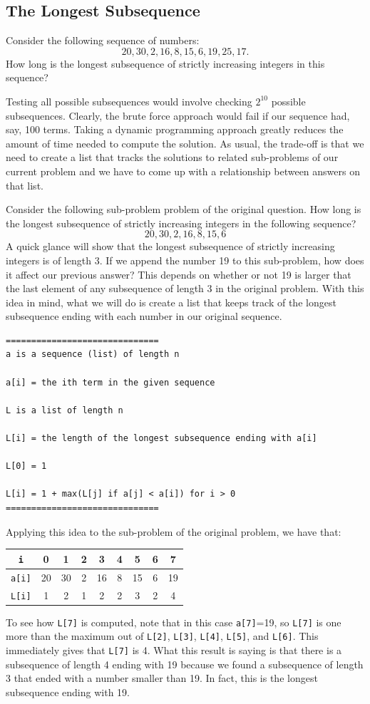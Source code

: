 \documentclass{ximera}
\begin{document}
\subsection{The Longest Subsequence}

Consider the following sequence of numbers: $$20,30,2,16,8,15,6,19,25,17.$$ How long is the longest subsequence of strictly increasing integers in this sequence?

Testing all possible subsequences would involve checking $2^{10}$ possible subsequences. Clearly, the brute force approach would fail if our sequence had, say, 100 terms. Taking a dynamic programming approach greatly reduces the amount of time needed to compute the solution. As usual, the trade-off is that we need to create a list that tracks the solutions to related sub-problems of our current problem and we have to come up with a relationship between answers on that list.

Consider the following sub-problem problem of the original question. How long is the longest subsequence of strictly increasing integers in the following sequence? $$20,30,2,16,8,15,6$$ A quick glance will show that the longest subsequence of strictly increasing integers is of length 3. If we append the number 19 to this sub-problem, how does it affect our previous answer? This depends on whether or not 19 is larger that the last element of any subsequence of length 3 in the original problem. With this idea in mind, what we will do is create a list that keeps track of the longest subsequence ending with each number in our original sequence. 

\begin{verbatim}
==============================
a is a sequence (list) of length n

a[i] = the ith term in the given sequence

L is a list of length n

L[i] = the length of the longest subsequence ending with a[i]

L[0] = 1

L[i] = 1 + max(L[j] if a[j] < a[i]) for i > 0
==============================
\end{verbatim}
Applying this idea to the sub-problem of the original problem, we have that:
\begin{center}
	\begin{tabular}{|c|c|c|c|c|c|c|c|c|}
		\hline
		\verb|i| & 0 & 1 & 2 & 3 & 4 & 5 & 6 & 7\\
		\hline
		\verb|a[i]| & 20 & 30 & 2 & 16 & 8 & 15 & 6 & 19 \\
		\hline
		\verb|L[i]| &  1 &  2 & 1 &  2 & 2 &  3 & 2 & 4 \\
		\hline
	\end{tabular}
\end{center}
To see how \verb|L[7]| is computed, note that in this case \verb|a[7]|=19, so \verb|L[7]| is one more than the maximum out of \verb|L[2]|, \verb|L[3]|, \verb|L[4]|, \verb|L[5]|, and \verb|L[6]|. This immediately gives that \verb|L[7]| is 4. What this result is saying is that there is a subsequence of length 4 ending with 19 because we found a subsequence of length 3 that ended with a number smaller than 19. In fact, this is the longest subsequence ending with 19.
\end{document}
